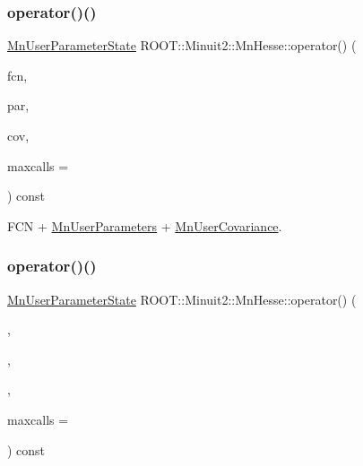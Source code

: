 \subsubsection{\texorpdfstring{operator()()}{operator()()}\hspace{0.1cm}{\footnotesize\ttfamily [14/24]}}
{\footnotesize\ttfamily \mbox{\hyperlink{classROOT_1_1Minuit2_1_1MnUserParameterState}{Mn\+User\+Parameter\+State}} R\+O\+O\+T\+::\+Minuit2\+::\+Mn\+Hesse\+::operator() (\begin{DoxyParamCaption}\item[{const \mbox{\hyperlink{classROOT_1_1Minuit2_1_1FCNBase}{F\+C\+N\+Base}} \&}]{fcn,  }\item[{const \mbox{\hyperlink{classROOT_1_1Minuit2_1_1MnUserParameters}{Mn\+User\+Parameters}} \&}]{par,  }\item[{const \mbox{\hyperlink{classROOT_1_1Minuit2_1_1MnUserCovariance}{Mn\+User\+Covariance}} \&}]{cov,  }\item[{unsigned int}]{maxcalls = {} }\end{DoxyParamCaption}) const}



F\+CN + \mbox{\hyperlink{classROOT_1_1Minuit2_1_1MnUserParameters}{Mn\+User\+Parameters}} + \mbox{\hyperlink{classROOT_1_1Minuit2_1_1MnUserCovariance}{Mn\+User\+Covariance}}. 

\mbox{\label{classROOT_1_1Minuit2_1_1MnHesse_aeba6a2c85b9bda7785d418a6e2605722}} 
\subsubsection{\texorpdfstring{operator()()}{operator()()}\hspace{0.1cm}{\footnotesize\ttfamily [15/24]}}
{\footnotesize\ttfamily \mbox{\hyperlink{classROOT_1_1Minuit2_1_1MnUserParameterState}{Mn\+User\+Parameter\+State}} R\+O\+O\+T\+::\+Minuit2\+::\+Mn\+Hesse\+::operator() (\begin{DoxyParamCaption}\item[{const \mbox{\hyperlink{classROOT_1_1Minuit2_1_1FCNBase}{F\+C\+N\+Base}} \&}]{,  }\item[{const \mbox{\hyperlink{classROOT_1_1Minuit2_1_1MnUserParameters}{Mn\+User\+Parameters}} \&}]{,  }\item[{const \mbox{\hyperlink{classROOT_1_1Minuit2_1_1MnUserCovariance}{Mn\+User\+Covariance}} \&}]{,  }\item[{unsigned int}]{maxcalls = {} }\end{DoxyParamCaption}) const}



